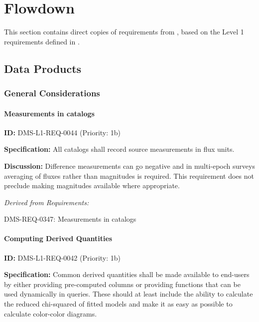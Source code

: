 \documentclass[SE,toc,lsstdraft]{lsstdoc}
\date{2018-01-19}
\begin{document}
\maketitle

\section{ Flowdown}

This section contains direct copies of requirements from , based on the Level 1 requirements defined in .

\subsection{Data Products}

\subsubsection{General Considerations}

\paragraph{Measurements in catalogs}\hfill  %

\label{DMS-L1-REQ-0044}
\textbf{ID:} DMS-L1-REQ-0044 (Priority: 1b)

\textbf{Specification: }All catalogs shall record source measurements in flux units.

\textbf{Discussion: }Difference measurements can go negative and in multi-epoch surveys averaging of fluxes rather than magnitudes is required. This requirement does not preclude making magnitudes available where appropriate.

\emph{Derived from Requirements:}

DMS-REQ-0347:
Measurements in catalogs \newline

\paragraph{Computing Derived Quantities}\hfill  %

\label{DMS-L1-REQ-0042}
\textbf{ID:} DMS-L1-REQ-0042 (Priority: 1b)

\textbf{Specification:} Common derived quantities shall be made available to end-users by either providing pre-computed columns or providing functions that can be used dynamically in queries. These should at least include the ability to calculate the reduced chi-squared of fitted models and make it as easy as possible to calculate color-color diagrams.
\end{document}
